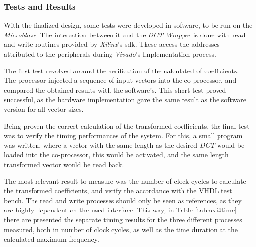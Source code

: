\subsubsection{Tests and Results}

With the finalized design, some tests were developed in software, to be run on the \emph{Microblaze}. The interaction between it and the \emph{DCT Wrapper} is done with read and write routines provided by \emph{Xilinx}'s \gls{sdk}. These access the addresses attributed to the peripherals during \emph{Vivado}'s Implementation process.

The first test revolved around the verification of the calculated of coefficients. The processor injected a sequence of input vectors into the co-processor, and compared the obtained results with the software's. This short test proved successful, as the hardware implementation gave the same result as the software version for all vector sizes.

Being proven the correct calculation of the transformed coefficients, the final test was to verify the timing performances of the system. For this, a small program was written, where a vector with the same length as the desired \emph{DCT} would be loaded into the co-processor, this would be activated, and the same length transformed vector would be read back.

The most relevant result to measure was the number of clock cycles to calculate the transformed coefficients, and verify the accordance with the VHDL test bench. The read and write processes should only be seen as references, as they are highly dependent on the used interface. This way, in Table \ref{tab:axi4time} there are presented the separate timing results for the three different processes measured, both in number of clock cycles, as well as the time duration at the calculated maximum frequency. 

